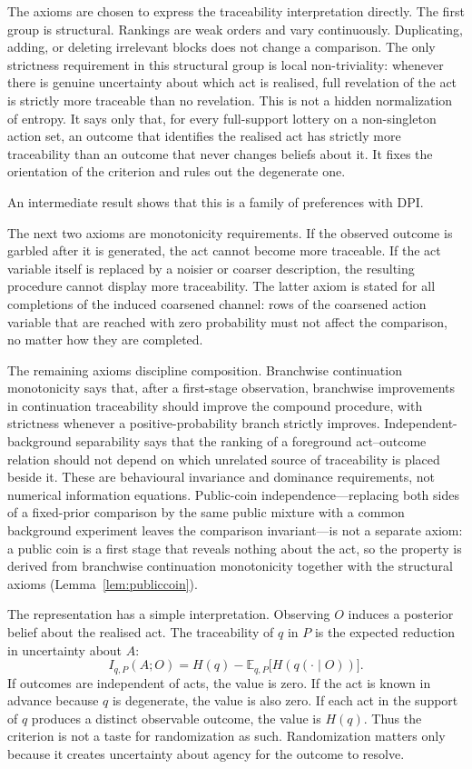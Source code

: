 \documentclass[11pt,a4paper]{article}
\theoremstyle{definition}
\newcommand{\E}{\mathbb E}
\newcommand{\1}{\mathbf 1}
\begin{document}
The axioms are chosen to express the traceability interpretation directly.  The first group is structural.  Rankings are weak orders and vary continuously.  Duplicating, adding, or deleting irrelevant blocks does not change a comparison.  The only strictness requirement in this structural group is local non-triviality: whenever there is genuine uncertainty about which act is realised, full revelation of the act is strictly more traceable than no revelation.  This is not a hidden normalization of entropy.  It says only that, for every full-support lottery on a non-singleton action set, an outcome that identifies the realised act has strictly more traceability than an outcome that never changes beliefs about it.  It
fixes the orientation of the criterion and rules out the degenerate one.

An intermediate result shows that this is a family of preferences with DPI.

The next two axioms are monotonicity requirements.  If the observed outcome is garbled after it is generated, the act
cannot become more traceable.  If the act variable itself is replaced by a noisier or coarser description, the resulting
procedure cannot display more traceability.  The latter axiom is stated for all completions of the induced coarsened
channel: rows of the coarsened action variable that are reached with zero probability must not affect the comparison, no
matter how they are completed.

The remaining axioms discipline composition.  Branchwise
continuation monotonicity says that, after a first-stage observation, branchwise improvements in continuation traceability
should improve the compound procedure, with strictness whenever a positive-probability branch strictly improves.
Independent-background separability says that the ranking of a foreground act--outcome relation should not depend on
which unrelated source of traceability is placed beside it.  These are behavioural invariance and dominance requirements,
not numerical information equations.  Public-coin independence---replacing both sides of a fixed-prior comparison by the
same public mixture with a common background experiment leaves the comparison invariant---is not a separate axiom: a
public coin is a first stage that reveals nothing about the act, so the property is derived from branchwise continuation
monotonicity together with the structural axioms (Lemma~\ref{lem:publiccoin}).


The representation has a simple interpretation.  Observing $O$ induces a posterior belief about the realised act.  The traceability of $q$ in $P$ is the expected reduction in uncertainty about $A$:
\[
I_{q,P}(A;O)
=
H(q)-\E_{q,P}\bigl[H(q(\cdot\mid O))\bigr].
\]
If outcomes are independent of acts, the value is zero.  If the act is known in advance because $q$ is degenerate, the value is also zero.  If each act in the support of $q$ produces a distinct observable outcome, the value is $H(q)$.  Thus the criterion is not a taste for randomization as such.  Randomization matters only because it creates uncertainty about agency for the outcome to resolve.
\end{document}
